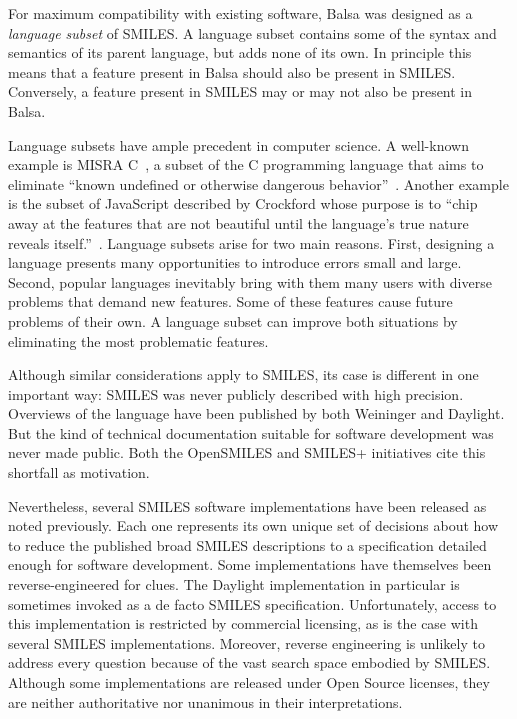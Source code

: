 \documentclass{article}
\begin{document}
For maximum compatibility with existing software, Balsa was designed as a \textit{language subset} of SMILES. A language subset contains some of the syntax and semantics of its parent language, but adds none of its own. In principle this means that a feature present in Balsa should also be present in SMILES. Conversely, a feature present in SMILES may or may not also be present in Balsa.

Language subsets have ample precedent in computer science. A well-known example is MISRA C~\cite{misraC}, a subset of the C programming language that aims to eliminate \enquote{known undefined or otherwise dangerous behavior}~\cite{hatton:2007}. Another example is the subset of JavaScript described by Crockford whose purpose is to \enquote{chip away at the features that are not beautiful until the language's true nature reveals itself.}~\cite{crockford:2008}. Language subsets arise for two main reasons. First, designing a language presents many opportunities to introduce errors small and large. Second, popular languages inevitably bring with them many users with diverse problems that demand new features. Some of these features cause future problems of their own. A language subset can improve both situations by eliminating the most problematic features.

Although similar considerations apply to SMILES, its case is different in one important way: SMILES was never publicly described with high precision. Overviews of the language have been published by both Weininger and Daylight. But the kind of technical documentation suitable for software development was never made public. Both the OpenSMILES and SMILES+ initiatives cite this shortfall as motivation.

Nevertheless, several SMILES software implementations have been released as noted previously. Each one represents its own unique set of decisions about how to reduce the published broad SMILES descriptions to a specification detailed enough for software development. Some implementations have themselves been reverse-engineered for clues. The Daylight implementation in particular is sometimes invoked as a de facto SMILES specification. Unfortunately, access to this implementation is restricted by commercial licensing, as is the case with several SMILES implementations. Moreover, reverse engineering is unlikely to address every question because of the vast search space embodied by SMILES. Although some implementations are released under Open Source licenses, they are neither authoritative nor unanimous in their interpretations.
\end{document}
